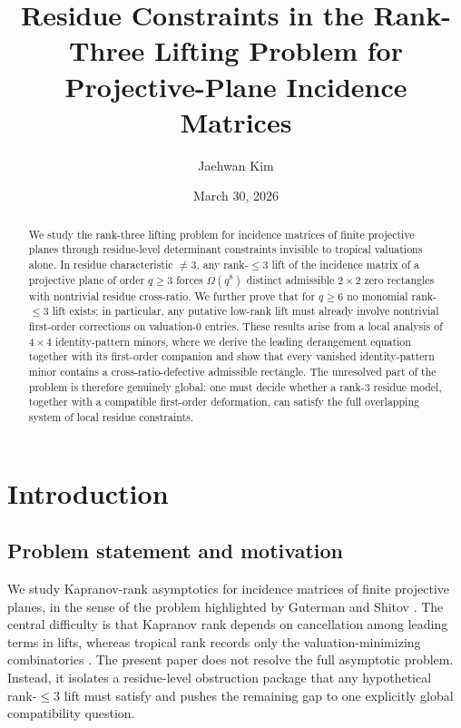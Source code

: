 \documentclass[11pt]{amsart}
\title[Residue constraints for projective-plane lifts]{Residue Constraints in the Rank-Three Lifting Problem for Projective-Plane Incidence Matrices}
\author{Jaehwan Kim}
\date{March 30, 2026}
\numberwithin{equation}{section}
\theoremstyle{plain}
\theoremstyle{definition}
\theoremstyle{remark}
\begin{document}
\begin{abstract}
We study the rank-three lifting problem for incidence matrices of finite projective
planes through residue-level determinant constraints invisible to tropical valuations
alone. In residue characteristic $\neq 3$, any rank-$\le 3$ lift of the incidence
matrix of a projective plane of order $q \ge 3$ forces $\Omega(q^8)$ distinct
admissible $2 \times 2$ zero rectangles with nontrivial residue cross-ratio.
We further prove that for $q \ge 6$ no monomial rank-$\le 3$ lift exists; in
particular, any putative low-rank lift must already involve nontrivial first-order
corrections on valuation-$0$ entries. These results arise from a local analysis
of $4 \times 4$ identity-pattern minors, where we derive the leading derangement
equation together with its first-order companion and show that every vanished
identity-pattern minor contains a cross-ratio-defective admissible rectangle.
The unresolved part of the problem is therefore genuinely global: one must decide
whether a rank-$3$ residue model, together with a compatible first-order deformation,
can satisfy the full overlapping system of local residue constraints.
\end{abstract}

\maketitle

\tableofcontents

\section{Introduction}

\subsection{Problem statement and motivation}
We study Kapranov-rank asymptotics for incidence matrices of finite projective planes, in the sense of the problem highlighted by Guterman and Shitov \cite{gutermanShitov2016}. The central difficulty is that Kapranov rank depends on cancellation among leading terms in lifts, whereas tropical rank records only the valuation-minimizing combinatorics \cite{develinSantosSturmfels2005,richterGebertSturmfelsTheobald2005,maclaganSturmfels2015,speyer2008,mikhalkin2007,einsiedlerKapranovLind2006}. The present paper does not resolve the full asymptotic problem. Instead, it isolates a residue-level obstruction package that any hypothetical rank-$\le 3$ lift must satisfy and pushes the remaining gap to one explicitly global compatibility question.
\end{document}
